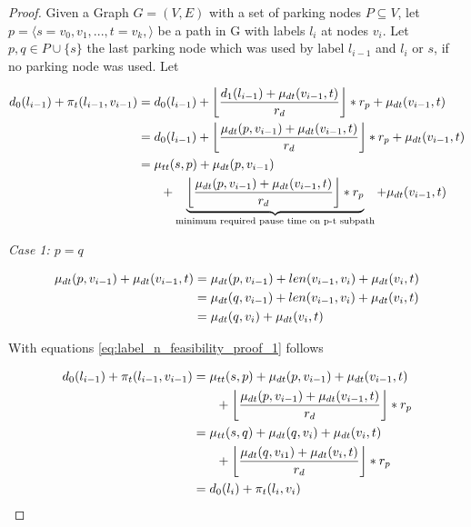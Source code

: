 \begin{proof}
	Given a Graph $G=(V,E)$ with a set of parking nodes $P \subseteq V$, let $p = \langle s=v_0,v_1,...,t=v_k, \rangle$ be a path in G with labels $l_i$ at nodes $v_i$. Let $p,q \in P \cup \{s\}$ the last parking node which was used by label $l_{i-1}$ and $l_{i}$ or $s$, if no parking node was used. Let

	\begin{align}
		\begin{split}\label{eq:label_n_feasibility_proof_1}
			d_0(l_{i-1}) + \pi_t(l_{i-1},v_{i-1}) &= d_0(l_{i-1})+\floor*{ \frac{d_1(l_{i-1}) + \drivingtime(v_{i-1},t)}{\restr_d} } * \restr_p + \drivingtime(v_{i-1},t)\\
			&= d_0(l_{i-1})+ \floor*{ \frac{\drivingtime(p,v_{i-1}) + \drivingtime(v_{i-1},t)}{\restr_d} } * \restr_p + \drivingtime(v_{i-1},t)\\
			&=\traveltime(s,p) + \drivingtime(p,v_{i-1})\\
			& \phantom{{}=1} + \underbrace{\floor*{ \frac{\drivingtime(p,v_{i-1}) + \drivingtime(v_{i-1},t)}{\restr_d} } * \restr_p}_\text{minimum required pause time on p-t subpath} + \drivingtime(v_{i-1},t)
		\end{split}
	\end{align}

	\emph{Case 1: $p=q$}

	\begin{align}
		\begin{split}\label{eq:label_n_feasibility_proof_2}
			\mu_{dt}(p,v_{i-1}) + \mu_{dt}(v_{i-1},t) & = \mu_{dt}(p,v_{i-1}) + len(v_{i-1},v_i) + \mu_{dt}(v_i,t) \\
			& = \mu_{dt}(q,v_{i-1}) + len(v_{i-1},v_i) + \mu_{dt}(v_i,t) \\
			& = \mu_{dt}(q,v_i) + \mu_{dt}(v_i,t)
		\end{split}
	\end{align}

	With equations \ref{eq:label_n_feasibility_proof_1} follows

	\begin{align}
		\begin{split}\label{eq:label_n_feasibility_proof_3}
			d_0(l_{i-1}) + \pi_t(l_{i-1},v_{i-1}) &= \traveltime(s,p) + \drivingtime(p,v_{i-1}) + \drivingtime(v_{i-1},t)\\
			& \phantom{{}=1} + \floor*{ \frac{\drivingtime(p,v_{i-1}) + \drivingtime(v_{i-1},t)}{\restr_d} } * \restr_p\\
			&= \traveltime(s,q) + \drivingtime(q,v_{i}) + \drivingtime(v_{i},t)\\
			& \phantom{{}=1} + \floor*{ \frac{\drivingtime(q,v_{i1}) + \drivingtime(v_{i},t)}{\restr_d} } * \restr_p\\
			&= d_0(l_{i}) + \pi_t(l_{i},v_{i})
		\end{split}
	\end{align}


\end{proof}
